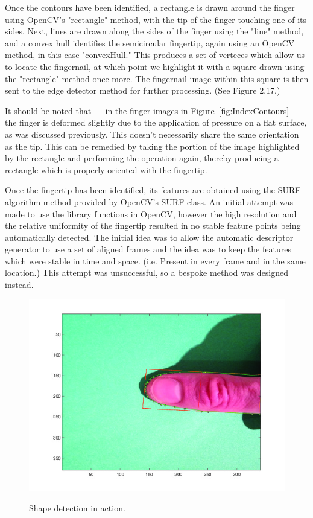 Once the contours have been identified, a rectangle is drawn around the finger using OpenCV's "rectangle" method, with the tip of the finger touching one of its sides. Next, lines are drawn along the sides of the finger using the "line" method, and a convex hull identifies the semicircular fingertip, again using an OpenCV method, in this case "convexHull." This produces a set of verteces which allow us to locate the fingernail, at which point we highlight it with a square drawn using the "rectangle" method once more. The fingernail image within this square is then sent to the edge detector method for further processing. (See Figure 2.17.)

It should be noted that --- in the finger images in Figure~\ref{fig:IndexContours} --- the finger is deformed slightly due to the application of pressure on a flat surface, as was discussed previously. This doesn't necessarily share the same orientation as the tip. This can be remedied by taking the portion of the image highlighted by the rectangle and performing the operation again, thereby producing a rectangle which is properly oriented with the fingertip.

Once the fingertip has been identified, its features are obtained using the SURF algorithm method provided by OpenCV's SURF class. An initial attempt was made to use the library functions in OpenCV, however the high resolution and the relative uniformity of the fingertip resulted in no stable feature points being automatically detected. The initial idea was to allow the automatic descriptor generator to use a set of aligned frames and the idea was to keep the features which were stable in time and space. (i.e. Present in every frame and in the same location.) This attempt was unsuccessful, so a bespoke method was designed instead.

\begin{figure}[h!]
  \centering
    \includegraphics[width=\textwidth]{Chapter4/Figs/shapeDetection.jpg}\label{fig:shapeDetection}
    \caption{Shape detection in action.}
\end{figure}

